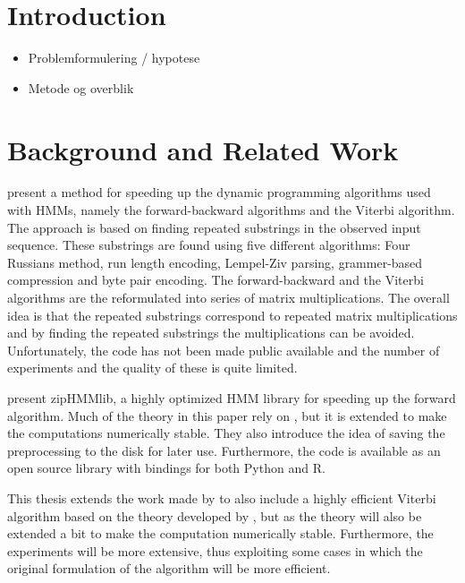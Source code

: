 \documentclass[11pt,twoside,a4,danish,english,report]{memoir}
\begin{document}
\cleardoublepage{}

\tableofcontents

\mainmatter{}

\chapter{Introduction}
\label{cha:introduction}

\begin{itemize}
\item Problemformulering / hypotese
\item Metode og overblik
\end{itemize}

\chapter{Background and Related Work}
\label{cha:backgr-relat-work}


\citet{lifshits2009speeding} present a method for speeding up the dynamic
programming algorithms used with HMMs, namely the forward-backward algorithms
and the Viterbi algorithm. The approach is based on finding repeated substrings
in the observed input sequence. These substrings are found using five different
algorithms: Four Russians method, run length encoding, Lempel-Ziv parsing,
grammer-based compression and byte pair encoding. The forward-backward and the
Viterbi algorithms are the reformulated into series of matrix
multiplications. The overall idea is that the repeated substrings correspond to
repeated matrix multiplications and by finding the repeated substrings the
multiplications can be avoided. Unfortunately, the code has not been made
public available and the number of experiments and the quality of these is
quite limited.

\citet{sand2013ziphmmlib} present zipHMMlib, a highly optimized HMM library for
speeding up the forward algorithm. Much of the theory in this paper rely on
\cite{lifshits2009speeding}, but it is extended to make the computations
numerically stable. They also introduce the idea of saving the preprocessing to
the disk for later use. Furthermore, the code is available as an open source
library with bindings for both Python and R.

This thesis extends the work made by \citet{sand2013ziphmmlib} to also include
a highly efficient Viterbi algorithm based on the theory developed by
\citet{lifshits2009speeding}, but as \citet{sand2013ziphmmlib} the theory will
also be extended a bit to make the computation numerically stable. Furthermore,
the experiments will be more extensive, thus exploiting some cases in which
the original formulation of the algorithm will be more efficient.
\end{document}
